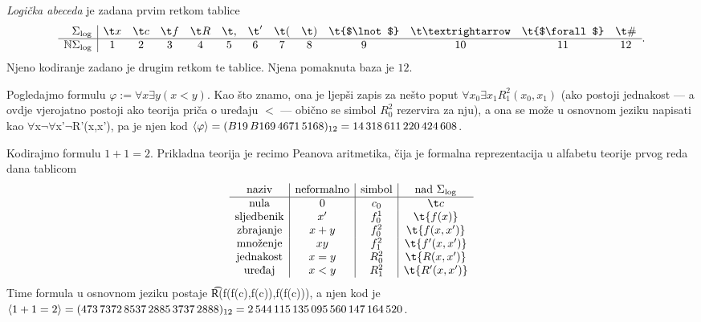 \begin{definicija}[{name=[logička abeceda i njeno kodiranje]}]
\emph{Logička abeceda} je zadana prvim retkom tablice
\begin{equation}
    \begin{array}{r|cccccccccccc}
        \Sigma_{\log}& \t x & \t c & \t f & \t R & \t, & \t' & \t( & \t) & \t{$\lnot$} & \t\textrightarrow & \t{$\forall$} & \t\# \\\hline
         \N\Sigma_{\log}& 1 & 2 & 3 & 4 & 5 & 6 & 7 & 8 & 9 & 10 & 11 & 12
    \end{array}\text.
\end{equation}
Njeno kodiranje zadano je drugim retkom te tablice. Njena pomaknuta baza je $12$. \end{definicija}

\begin{primjer}[{name=[kodiranje formule "ne postoji najveći element"]}]
Pogledajmo formulu $\varphi:=\forall x\exists y(x<y)$. Kao što znamo, ona je ljepši zapis za nešto poput $\forall x_0\exists x_1 R_1^2(x_0,x_1)$ (ako postoji jednakost --- a ovdje vjerojatno postoji ako teorija priča o uređaju $<$ --- obično se simbol $R_0^2$ rezervira za nju), a ona se može u osnovnom jeziku napisati kao \t{$\forall$x$\lnot\forall$x'$\lnot$R'(x,x')}, pa je njen kod $\langle\varphi\rangle=(B19\,B169\,4671\,5168)_{12}=14\,318\,611\,220\,424\,608$.
\end{primjer}

\begin{primjer}[{name=[kodiranje jednostavne aritmetičke formule]}]
Kodirajmo formulu $1+1=2$. Prikladna teorija je recimo Peanova aritmetika, čija je formalna reprezentacija u alfabetu teorije prvog reda dana tablicom
\begin{equation}
    \begin{array}{c|c|c|c}
        \text{naziv}&\text{neformalno}&\text{simbol}&\text{nad }\Sigma_{\log}\\\hline
        \text{nula} & 0 & c_0 & \t c\\
        \text{sljedbenik} & x' & f_0^1 & \t{f(x)} \\
        \text{zbrajanje} & x+y & f_0^2 & \t{f(x,x')}\\
        \text{množenje} & xy & f_1^2 & \t{f'(x,x')}\\
        \text{jednakost} & x=y & R_0^2 & \t{R(x,x')}\\
        \text{uređaj} & x<y & R_1^2 & \t{R'(x,x')}
    \end{array}
\end{equation}
Time formula u osnovnom jeziku postaje \t{R(f(f(c),f(c)),f(f(c)))}, a njen kod je $\langle1+1=2\rangle=(473\,7372\,8537\,2885\,3737\,2888)_{12}=2\,544\,115\,135\,095\,560\,147\,164\,520$.
\end{primjer}

